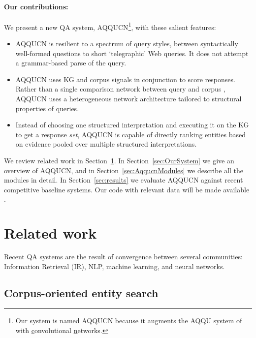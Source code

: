 \documentclass{svjour3}
\begin{document}
\paragraph{Our contributions:}
We present a new QA system, AQQUCN\footnote{Our system is named AQQUCN because it augments the AQQU system of \citet{BastH2015aqqu} with \underline{c}onvolutional \underline{n}etworks.}, with these salient features:
\begin{itemize}
\item AQQUCN is resilient to a spectrum of query styles, between syntactically well-formed questions to short `telegraphic' Web queries.  It does not attempt a grammar-based parse of the query.
\item AQQUCN uses KG and corpus signals in conjunction to score responses.  Rather than a single comparison network between query and corpus \citep{SeverynM2015SiamConvNet,BahdanauCB2014Attention}, AQQUCN uses a heterogeneous network architecture tailored to structural properties of queries.
\item Instead of choosing one structured interpretation and executing it on the KG to get a response \emph{set}, AQQUCN is capable of directly ranking entities based on evidence pooled over multiple structured interpretations.
\end{itemize}
We review related work in Section~\ref{sec:Rel}.  In Section~\ref{sec:OurSystem} we give an overview of AQQUCN, and in Section~\ref{sec:AqqucnModules} we describe all the modules in detail.  In Section~\ref{sec:results} we evaluate AQQUCN against recent competitive baseline systems.  Our code with relevant data will be made available \citep{CsawProject}.
\nocite{SawantCR2018aqqucn1}


\section{Related work}
\label{sec:Rel}

Recent QA systems are the result of convergence between several communities: Information Retrieval (IR), NLP, machine learning, and neural networks.

\subsection{Corpus-oriented entity search}
\label{sec:Rel:CorpusQA}
\end{document}
